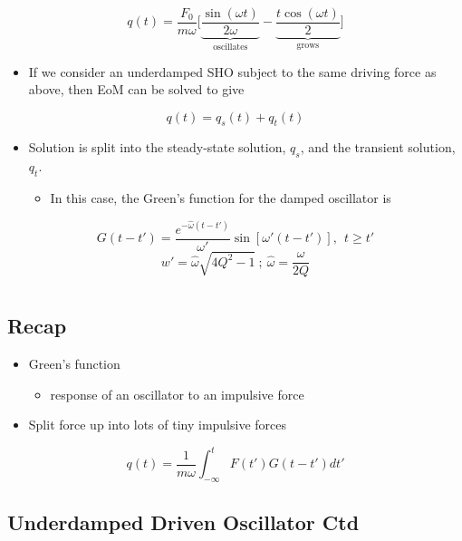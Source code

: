 \documentclass[a4paper,11pt,normalem]{article}
\begin{document}
\begin{example}
\[
    q(t) = \frac{F_0}{m\omega}\Big[\underbrace{\frac{\sin(\omega t)}{2\omega}}_{\text{oscillates}} - \underbrace{\frac{t\cos(\omega t)}{2}}_{\text{grows}} \Big]
\]

\begin{itemize}
\item
  If we consider an underdamped SHO subject to the same driving force as
  above, then EoM can be solved to give
\end{itemize}

\[
    q(t) = q_{s}(t) + q_{t}(t)
\]

\begin{itemize}
\item
  Solution is split into the steady-state solution, \(q_{s}\), and the
  transient solution, \(q_{t}\).
  \begin{itemize}
  \item
    In this case, the Green's function for the damped oscillator is
  \end{itemize}
\end{itemize}

\[
    G(t - t') = \frac{e^{-\hat{\omega}(t - t')}}{\omega'}\sin[\omega'(t - t')], ~~ t \geq t' \]
\[
    w' = \hat{\omega}\sqrt{4Q^2 - 1} ~;~ \hat{\omega} = \frac{\omega}{2Q}
\]
\end{example}

\section{}\label{lecture-6}

\subsection{Recap}\label{recap}

\begin{itemize}
\item
  Green's function
  \begin{itemize}
  \item
    response of an oscillator to an impulsive force
  \end{itemize}
\item
  Split force up into lots of tiny impulsive forces
\end{itemize}

\[
    q(t) = \frac{1}{m\omega} \int_{-\infty}^{t} F(t')G(t - t')dt'
\]

\subsection{Underdamped Driven Oscillator Ctd}\label{underdamped-driven-oscillator-ctd}
\end{document}

